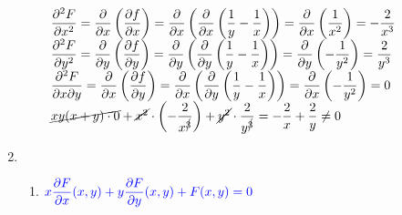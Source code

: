 \begin{enumerate}[label=\c olor{red}\textbf{\arabic*)}, leftmargin=*]
\begin{enumerate}[label=\color{red}\textbf{\alph*)}]
		$\begin{array}{l}
		\dfrac{\partial^2 F}{\partial x^2}=\dfrac{\partial }{\partial x}\left(\dfrac{\partial f}{\partial x}\right)=\dfrac{\partial}{\partial x}\left(\dfrac{\partial }{\partial x}\left(\dfrac{1}{y}-\dfrac{1}{x}\right)\right)=\dfrac{\partial }{\partial x}\left(\dfrac{1}{x^2}\right)=-\dfrac{2}{x^3}\\
		\dfrac{\partial^2 F}{\partial y^2}=\dfrac{\partial }{\partial y}\left(\dfrac{\partial f}{\partial y}\right)=\dfrac{\partial}{\partial y}\left(\dfrac{\partial }{\partial y}\left(\dfrac{1}{y}-\dfrac{1}{x}\right)\right)=\dfrac{\partial}{\partial y}\left(-\dfrac{1}{y^2}\right)=\dfrac{2}{y^3}\\
		\dfrac{\partial^2 F}{\partial x\partial y}=\dfrac{\partial }{\partial x}\left(\dfrac{\partial f}{\partial y}\right)=\dfrac{\partial}{\partial x}\left(\dfrac{\partial }{\partial y}\left(\dfrac{1}{y}-\dfrac{1}{x}\right)\right)=\dfrac{\partial}{\partial x}\left(-\dfrac{1}{y^2}\right)=0\\
		\cancel{xy(x+y)\cdot0}+\cancel{x^2}\cdot\left(-\dfrac{2}{x^{\cancel{3}}}\right)+\cancel{y^2}\cdot\dfrac{2}{y^{\cancel{3}}}=-\dfrac{2}{x}+\dfrac{2}{y}\neq0
		\end{array}$
	\end{enumerate}
	\item {}
	\begin{enumerate}[label=\color{red}\textbf{\alph*)}]
		\item $\textcolor{blue}{x\dfrac{\partial F}{\partial x}(x,y)+y\dfrac{\partial F}{\partial y}(x,y)+F(x,y)=0}$
		

\end{enumerate}
\end{enumerate}
